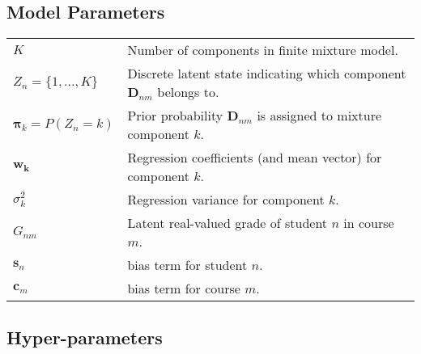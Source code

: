\documentclass[10pt]{proc}
\begin{document}
\subsection{Model Parameters}

{\footnotesize
\begin{tabular}{p{} p{}}
    $K$                         &   Number of components in finite mixture model. \\
    $Z_{n} = \{1, ..., K\}$     &   Discrete latent state indicating which
                                    component $\bm{D}_{nm}$ belongs to.           \\
    $\bm{\pi}_k = P(Z_n = k)$   &   Prior probability $\bm{D}_{nm}$ is assigned
                                    to mixture component $k$.                     \\
    $\bm{w_k}$          &   Regression coefficients (and mean vector)
                            for component $k$.                                    \\
    $\sigma_k^2$        &   Regression variance for component $k$.                \\
    $G_{nm}$            &   Latent real-valued grade of student $n$ in course $m$.\\
    $\bm{s}_n$          &   bias term for student $n$.                            \\
    $\bm{c}_m$          &   bias term for course $m$.                             \\
\end{tabular}}

\subsection{Hyper-parameters}
\end{document}
